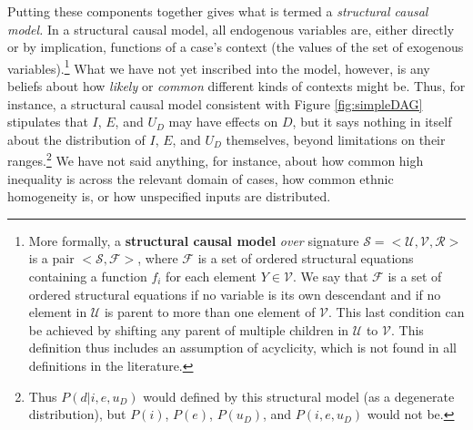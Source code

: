 \documentclass[12pt,]{book}
\let\rmarkdownfootnote\footnote%
\def\footnote{\protect\rmarkdownfootnote}
\begin{document}
Putting these components together gives what is termed a \emph{structural causal model.} In a structural causal model, all endogenous variables are, either directly or by implication, functions of a case's context (the values of the set of exogenous variables).\footnote{More formally, a \textbf{structural causal model} \emph{over} signature \(\mathcal{S}=<\mathcal{U},\mathcal{V},\mathcal{R}>\) is a pair \(<\mathcal{S}, \mathcal{F}>\), where \(\mathcal{F}\) is a set of ordered structural equations containing a function \(f_i\) for each element \(Y\in \mathcal{V}\). We say that \(\mathcal{F}\) is a set of ordered structural equations if no variable is its own descendant and if no element in \(\mathcal{U}\) is parent to more than one element of \(\mathcal{V}\). This last condition can be achieved by shifting any parent of multiple children in \(\mathcal{U}\) to \(\mathcal{V}\). This definition thus includes an assumption of acyclicity, which is not found in all definitions in the literature.} What we have not yet inscribed into the model, however, is any beliefs about how \emph{likely} or \emph{common} different kinds of contexts might be. Thus, for instance, a structural causal model consistent with Figure \ref{fig:simpleDAG} stipulates that \(I\), \(E\), and \(U_D\) may have effects on \(D\), but it says nothing in itself about the distribution of \(I\), \(E\), and \(U_D\) themselves, beyond limitations on their ranges.\footnote{Thus \(P(d|i,e, u_D)\) would defined by this structural model (as a degenerate distribution), but \(P(i)\), \(P(e)\), \(P(u_D)\), and \(P(i,e, u_D)\) would not be.} We have not said anything, for instance, about how common high inequality is across the relevant domain of cases, how common ethnic homogeneity is, or how unspecified inputs are distributed.
\end{document}
